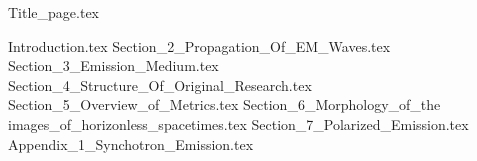 \documentclass[a4paper,11pt]{article}
\numberwithin{equation}{section}
\numberwithin{figure}{section}
\begin{document}
\lfoot{}
{Title_page.tex}
\lfoot{}
\tableofcontents
\listoffigures
\listoftables
\newpage
\lfoot{}
{Introduction.tex}
\newpage
\lfoot{}
{Section_2_Propagation_Of_EM_Waves.tex}
\newpage
\lfoot{}
{Section_3_Emission_Medium.tex}
\newpage
\lfoot{}
{Section_4_Structure_Of_Original_Research.tex}
\newpage
\lfoot{}
{Section_5_Overview_of_Metrics.tex}
\newpage
\lfoot{}
{Section_6_Morphology_of_the images_of_horizonless_spacetimes.tex}
\newpage
\lfoot{}
{Section_7_Polarized_Emission.tex}
\newpage
\lfoot{}
{Appendix_1_Synchotron_Emission.tex}
\lfoot{}
\end{document}
